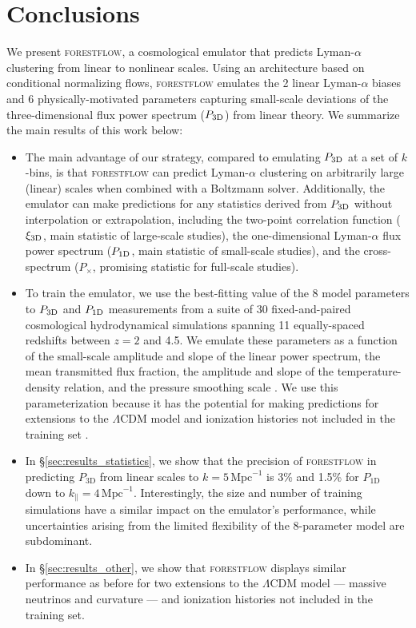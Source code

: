 \documentclass[fleqn,usenatbib]{mnras}
\newcommand{\lya}{Lyman-$\alpha$\xspace}
\newcommand{\pcross}{$P_{\times}$\xspace}
\newcommand{\poned}{\ensuremath{P_{\rm 1D}}\xspace}
\newcommand{\xithreed}{\ensuremath{\xi_{\rm 3D}}\xspace}
\newcommand{\pthreed}{\ensuremath{P_{\rm 3D}}\xspace}
\newcommand{\forestflow}{\textsc{forestflow}\xspace}
\newcommand{\iMpc}{\ensuremath{\,\mathrm{Mpc}^{-1}}}
\begin{document}

\section{Conclusions}
\label{sec:conclusions}

We present \forestflow, a cosmological emulator that predicts \lya clustering from linear to nonlinear scales. Using an architecture based on conditional normalizing flows, \forestflow emulates the 2 linear \lya biases and 6 physically-motivated parameters capturing small-scale deviations of the three-dimensional flux power spectrum (\pthreed) from linear theory. We summarize the main results of this work below:

\begin{itemize}
    \item The main advantage of our strategy, compared to emulating \pthreed at a set of $k$-bins, is that \forestflow can predict \lya clustering on arbitrarily large (linear) scales when combined with a Boltzmann solver. Additionally, the emulator can make predictions for any statistics derived from \pthreed without interpolation or extrapolation, including the two-point correlation function (\xithreed, main statistic of large-scale studies), the one-dimensional \lya flux power spectrum (\poned, main statistic of small-scale studies), and the cross-spectrum (\pcross, promising statistic for full-scale studies).

    \item To train the emulator, we use the best-fitting value of the 8 model parameters to \pthreed and \poned measurements from a suite of 30 fixed-and-paired cosmological hydrodynamical simulations spanning 11 equally-spaced redshifts between $z=2$ and 4.5. We emulate these parameters as a function of the small-scale amplitude and slope of the linear power spectrum, the mean transmitted flux fraction, the amplitude and slope of the temperature-density relation, and the pressure smoothing scale \citep[see][]{Pedersen2021}. We use this parameterization because it has the potential for making predictions for extensions to the $\Lambda$CDM model and ionization histories not included in the training set \citep[][]{ pedersen2023CompressingCosmologicalInformation, cabayol-garcia2023NeuralNetworkEmulator}. 

    \item In \S\ref{sec:results_statistics}, we show that the precision of \textsc{forestflow} in predicting $P_\mathrm{3D}$ from linear scales to $k=5\iMpc$ is 3\% and 1.5\% for $P_\mathrm{1D}$ down to $k_\parallel=4\iMpc$. Interestingly, the size and number of training simulations have a similar impact on the emulator's performance, while uncertainties arising from the limited flexibility of the 8-parameter model are subdominant. 

    \item In \S\ref{sec:results_other}, we show that \forestflow displays similar performance as before for two extensions to the $\Lambda$CDM model --- massive neutrinos and curvature --- and ionization histories not included in the training set. 
\end{itemize}
\end{document}
